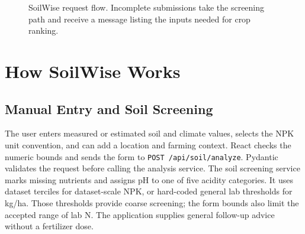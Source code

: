 \documentclass[conference]{IEEEtran}
\begin{document}
\begin{figure}[t]
\centering
{}
\caption{SoilWise request flow. Incomplete submissions take the screening path and receive a message listing the inputs needed for crop ranking.}
\label{fig:flow}
\end{figure}

\section{How SoilWise Works}
\subsection{Manual Entry and Soil Screening}
The user enters measured or estimated soil and climate values, selects the NPK unit convention, and can add a location and farming context. React checks the numeric bounds and sends the form to \texttt{POST /api/soil/analyze}. Pydantic validates the request before calling the analysis service. The soil screening service marks missing nutrients and assigns pH to one of five acidity categories. It uses dataset terciles for dataset-scale NPK, or hard-coded general lab thresholds for kg/ha. Those thresholds provide coarse screening; the form bounds also limit the accepted range of lab N. The application supplies general follow-up advice without a fertilizer dose.
\end{document}
